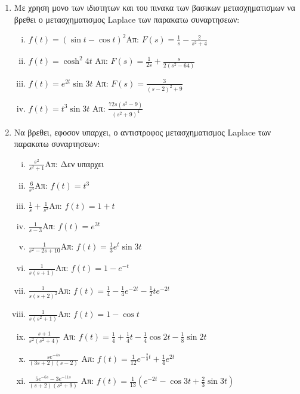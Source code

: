



\everymath{\displaystyle}



\begin{center}
\end{center}

\vspace{\baselineskip}

\begin{enumerate}

\item Με χρηση μονο των ιδιοτητων και του πινακα των βασικων μετασχηματισμων να βρεθει ο μετασχηματισμος Laplace των παρακατω συναρτησεων:

\begin{enumerate}[i)]

\item $f(t)=(\sin t-\cos t)^2$\hfill Απ: $F(s)=\frac{1}{s}-\frac{2}{s^2+4}$

\item $f(t)=\cosh^2 4t$ \hfill Απ: $F(s)=\frac{1}{2s}+\frac{s}{2(s^2-64)}$

\item $f(t)=e^{2t}\sin 3t$ \hfill Απ: $F(s)=\frac{3}{(s-2)^2+9}$


\item $f(t)=t^3\sin 3t$ \hfill Απ: $\frac{72s(s^2-9)}{(s^2+9)^4}$

\end{enumerate}

\item Να βρεθει, εφοσον υπαρχει, ο αντιστροφος μετασχηματισμος Laplace των παρακατω συναρτησεων:

\begin{enumerate}[i)]

\item $\frac{s^2}{s^2+1}$\hfill Απ: Δεν υπαρχει
\item $\frac{6}{s^4}$\hfill Απ: $f(t)=t^3$
\item $\frac{1}{s}+\frac{1}{s^2}$\hfill Απ: $f(t)=1+t$
\item $\frac{1}{s-3}$\hfill Απ: $f(t)=e^{3t}$
\item $\frac{1}{s^2-2s+10}$\hfill Απ: $f(t)=\frac{1}{3}e^t\sin 3t$
\item $\frac{1}{s(s+1)}$\hfill Απ: $f(t)=1-e^{-t}$
\item $\frac{1}{s(s+2)^2}$\hfill Απ: $f(t)=\frac{1}{4}-\frac{1}{4}e^{-2t}-\frac{1}{2}te^{-2t}$
\item $\frac{1}{s(s^2+1)}$\hfill Απ: $f(t)=1-\cos t$
\item $\frac{s+1}{s^{2}(s^{2}+4)}$ \hfill Απ: $f(t)=\frac{1}{4}+\frac{1}{4}t-\frac{1}{4}\cos 2t -\frac{1}{8}\sin 2t$
\item $\frac{se^{-4s}}{(3s+2)(s-2)}$ \hfill Απ: $f(t)=\frac{1}{12}e^{-\frac{2}{3}t}+\frac{1}{4}e^{2t}$
\item $\frac{5e^{-6s}-3e^{-11s}}{(s+2)(s^{2}+9)}$ \hfill Απ: $f(t)=\frac{1}{13}(e^{-2t}-\cos 3t+\frac{2}{3}\sin 3t)$


\end{enumerate}
\end{enumerate}
